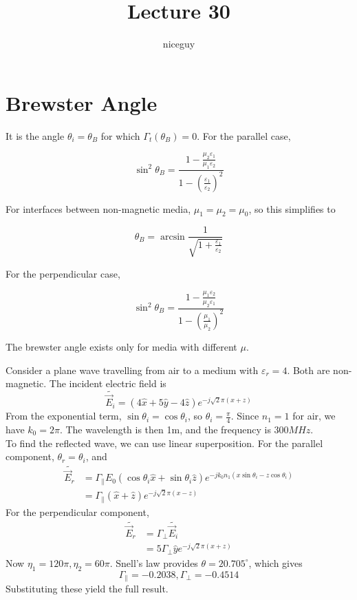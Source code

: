 \documentclass[12pt]{article}
\title{Lecture 30}
\author{niceguy}
\begin{document}
\maketitle

\section{Brewster Angle}

It is the angle $\theta_i = \theta_B$ for which $\Gamma_t(\theta_B) = 0$. For the parallel case,

$$\sin^2\theta_B = \frac{1 - \frac{\mu_2\varepsilon_1}{\mu_1\varepsilon_2}}{1 - \left(\frac{\varepsilon_1}{\varepsilon_2}\right)^2}$$

For interfaces between non-magnetic media, $\mu_1 = \mu_2 = \mu_0$, so this simplifies to

$$\theta_B = \arcsin\frac{1}{\sqrt{1 + \frac{\varepsilon_1}{\varepsilon_2}}}$$

For the perpendicular case,

$$\sin^2\theta_B = \frac{1 - \frac{\mu_1\varepsilon_2}{\mu_2\varepsilon_1}}{1 - \left(\frac{\mu_1}{\mu_2}\right)^2}$$

The brewster angle exists only for media with different $\mu$.

\begin{ex}
    Consider a plane wave travelling from air to a medium with $\varepsilon_r = 4$. Both are non-magnetic. The incident electric field is
    $$\tilde{\vec E_i} = (4\hat x + 5\hat y - 4\hat z) e^{-j\sqrt{2}\pi(x+z)}$$
    From the exponential term, $\sin\theta_i = \cos\theta_i$, so $\theta_i = \frac{\pi}{4}$. Since $n_1 = 1$ for air, we have $k_0 = 2\pi$. The wavelength is then 1m, and the frequency is $300\unit{MHz}$. \\
    To find the reflected wave, we can use linear superposition. For the parallel component, $\theta_r = \theta_i$, and
    \begin{align*}
        \tilde{\vec E_r} &= \Gamma_\parallel E_0(\cos\theta_i\hat x + \sin\theta_i\hat z)e^{-jk_0n_1(x\sin\theta_i - z\cos\theta_i)} \\
                         &= \Gamma_\parallel (\hat x + \hat z)e^{-j\sqrt{2}\pi(x-z)}
    \end{align*}
    For the perpendicular component,
    \begin{align*}
        \tilde{\vec E_r} &= \Gamma_\perp \tilde{\vec E_i} \\
                         &= 5\Gamma_\perp \hat y e^{-j\sqrt{2}\pi(x+z)}
    \end{align*}
    Now $\eta_1 = 120\pi, \eta_2 = 60\pi$. Snell's law provides $\theta = 20.705^\circ$, which gives
    $$\Gamma_\parallel = -0.2038, \Gamma_\perp = -0.4514$$
    Substituting these yield the full result.
\end{ex}
\end{document}
